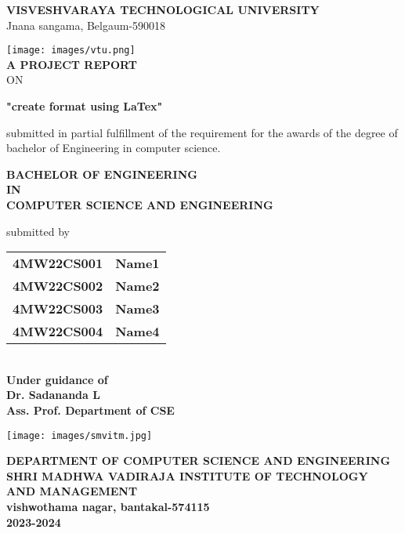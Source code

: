 \documentclass[12pt, a4paper]{report}
\begin{document}
\begin{titlepage}
\begin{center}
\textbf{{\large VISVESHVARAYA TECHNOLOGICAL UNIVERSITY}}\\
{ \normalsize Jnana sangama, Belgaum-590018 }\\
\vspace{0.5cm}

\texttt{[image: images/vtu.png]}\\
\vspace{0.5cm}
\textbf{\large A PROJECT REPORT}\\ ON\\
\vspace{0.5cm}

\textbf{{\large "create format using LaTex"}}\\
\vspace{0.3cm}

{\small submitted in partial fulfillment of the requirement for the awards of the degree of bachelor of Engineering in computer science.}\\
\vspace{0.2cm}

\textbf{\large BACHELOR OF ENGINEERING \\IN\\ COMPUTER SCIENCE AND ENGINEERING}\\
\vspace{0.3cm}

{submitted by}\\ 
\vspace{0.2cm}
\begin{tabular}{cc}
\textbf{4MW22CS001} & \textbf{Name1}\\
\textbf{4MW22CS002} & \textbf{Name2}\\
\textbf{4MW22CS003} & \textbf{Name3}\\
\textbf{4MW22CS004} & \textbf{Name4}\\
\end{tabular}\\
\vspace{0.5cm}
\textbf{Under guidance of\\ Dr. Sadananda L\\ Ass. Prof. Department of CSE}\\
\vspace{0.5cm}

\texttt{[image: images/smvitm.jpg]}\\
\vspace{0.4cm}

\textbf{ DEPARTMENT OF COMPUTER SCIENCE AND ENGINEERING}\\
\vspace{0.2cm}
\textbf{ SHRI MADHWA VADIRAJA INSTITUTE OF TECHNOLOGY AND MANAGEMENT}\\
\textbf{\small vishwothama nagar, bantakal-574115}\\
\vspace{0.3cm}
\textbf{\small 2023-2024}
\end{center}
\end{titlepage}
\end{document}
